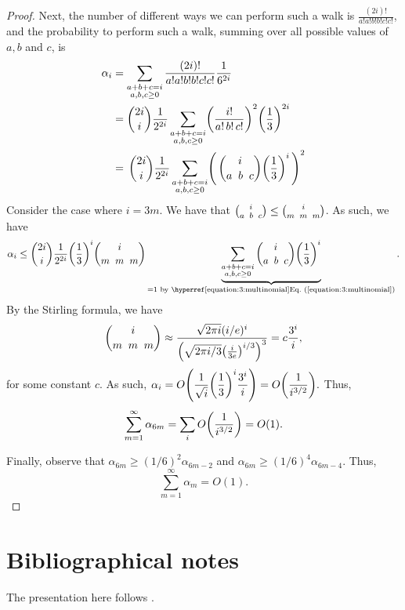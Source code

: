 \begin{proof}
    Next, the number of different ways we can perform such a walk is
    $\frac{(2i)!}{ a!  a! b! b! c! c!}$, and the probability to
    perform such a walk, summing over all possible values of $a,b$ and
    $c$, is
    \begin{align*}
        \alpha_i%
        &=%
        \sum_{\substack{a+b+c =i\\
              a,b,c \geq 0}} \frac{(2i)!}{ a!  a! b! b! c!
           c!}\frac{1}{6^{2i}}%
        \\&=%
        \binom{2i}{i} \frac{1}{2^{2i}}
        \sum_{\substack{a+b+c =i\\
              a,b,c \geq 0}} \pth{\frac{i!}{a! \, b! \, c!}}^2
        \pth{\frac{1}{3}}^{2i}
        \\&=%
        \,\binom{2i}{i} \frac{1}{2^{2i}}
        \sum_{\substack{a+b+c =i\\
              a,b,c \geq 0}} \pth[]{\,\trinom{i}{a}{b}{c}
           \pth{\frac{1}{3}}^{i} \, }^2
    \end{align*}
    Consider the case where $i=3m$. We have that $\binom{i}{a \;\; b \;\; c}
    \leq \binom{i}{m \;\; m \;\; m}$. As such, we have
    \begin{equation*}
        \alpha_i%
        \leq%
        \binom{2i}{i} \frac{1}{2^{2i}} \pth{\frac{1}{3}}^{i}
        \trinom{i}{m}{m}{m}
        \underbrace{%
           \sum_{\substack{a+b+c =i\\
                 a,b,c \geq 0}} \trinom{i}{a}{b}{c}
           \pth{\frac{1}{3}}^{i}
        }_{=1 \text{ by    \Eqref{3:multinomial}}}.
    \end{equation*}
    By the Stirling formula, we have
    \begin{equation*}
        \trinom{i}{m}{m}{m} \approx \frac{\sqrt{2 \pi i}(i/e)^i}
        {\pth{ \sqrt{2 \pi i/3 } \pth[]{\frac{i}{3e} }^{i/3} }^3} = c
        \frac{3^i}{i},
    \end{equation*}
    for some constant $c$. As such,
    \begin{math}
        \ds \alpha_i = O \pth[]{\frac{1}{\sqrt{i}}
           \pth[]{\frac{1}{3}}^{i} \frac{3^i}{i}}%
        =%
        O\pth[]{ \frac{1}{i^{3/2}} }.
    \end{math}
    Thus,
    \begin{equation*}
        \sum_{m=1}^{\infty} \alpha_{6m} = \sum_{i} O\pth[]{
           \frac{1}{i^{3/2}} } = O(1).
    \end{equation*}
    
    Finally, observe that $\alpha_{6m} \geq (1/6)^2 \alpha_{6m-2}$ and
    $\alpha_{6m} \geq (1/6)^4 \alpha_{6m-4}$. Thus,
    \begin{equation*}
        \sum_{m=1}^{\infty} \alpha_{m} = O(1).
    \end{equation*}
\end{proof}


\section{Bibliographical notes}

The presentation here follows \cite{n-mc-98}.

\ChapterEnd
%  



